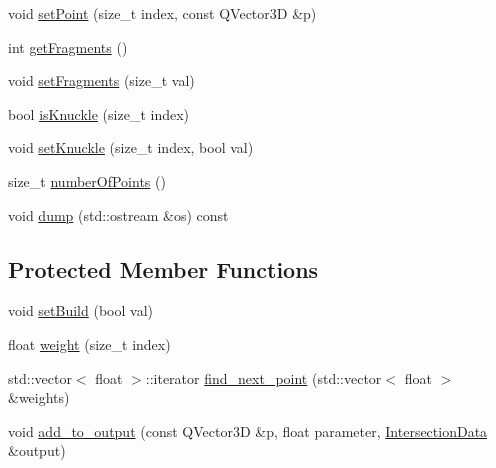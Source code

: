 \begin{DoxyCompactItemize}
void \hyperlink{classShipCAD_1_1Spline_ae02af8d5473f952644ac5103d7beebf2}{set\-Point} (size\-\_\-t index, const Q\-Vector3\-D \&p)
\item 
int \hyperlink{classShipCAD_1_1Spline_a489b034b416be54fe323ad021620f820}{get\-Fragments} ()
\item 
void \hyperlink{classShipCAD_1_1Spline_aaae6e558fad0833cde71f9ed38e4fb96}{set\-Fragments} (size\-\_\-t val)
\item 
bool \hyperlink{classShipCAD_1_1Spline_a90a954f52321f3b1b27b43991e9997a5}{is\-Knuckle} (size\-\_\-t index)
\item 
void \hyperlink{classShipCAD_1_1Spline_ad4f075e2e8f1d3ac7c2d22b5be75bbad}{set\-Knuckle} (size\-\_\-t index, bool val)
\item 
size\-\_\-t \hyperlink{classShipCAD_1_1Spline_ae22e067eaf100aca4cd4262e283ec089}{number\-Of\-Points} ()
\item 
void \hyperlink{classShipCAD_1_1Spline_a156ffe855d149ad445b178078ee4451c}{dump} (std\-::ostream \&os) const 
\end{DoxyCompactItemize}
\subsection*{Protected Member Functions}
\begin{DoxyCompactItemize}
\item 
void \hyperlink{classShipCAD_1_1Spline_a6e932411f0f4463514f80011c58f5e6a}{set\-Build} (bool val)
\item 
float \hyperlink{classShipCAD_1_1Spline_a63165f7cf70338e51b0f16504366031e}{weight} (size\-\_\-t index)
\item 
std\-::vector$<$ float $>$\-::iterator \hyperlink{classShipCAD_1_1Spline_a20b39f3a1bd853040df4760cd912ee64}{find\-\_\-next\-\_\-point} (std\-::vector$<$ float $>$ \&weights)
\item 
void \hyperlink{classShipCAD_1_1Spline_ab8f0b98595ccbd62e754fe92354a207b}{add\-\_\-to\-\_\-output} (const Q\-Vector3\-D \&p, float parameter, \hyperlink{classShipCAD_1_1IntersectionData}{Intersection\-Data} \&output)
\end{DoxyCompactItemize}
